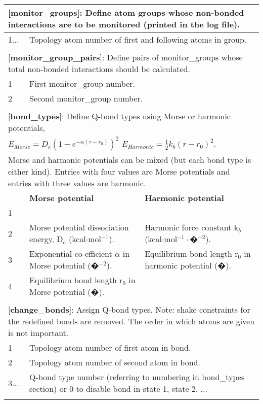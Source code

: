 \documentclass[a4paper,10pt]{article}
\begin{document}
\begin{longtable}{|p{53pt}|p{181pt}|p{160pt}|}
\multicolumn{3}{p{394pt}}{[\textbf{monitor\_groups}]: Define atom groups whose non-bonded interactions are to be monitored (printed in the log file).}\\
\hline 1... & \multicolumn{2}{p{341pt}|}{Topology atom number of first and following atoms in group.}\\
\hline
\multicolumn{3}{p{394pt}}{}\\

\multicolumn{3}{p{394pt}}{[\textbf{monitor\_group\_pairs}]: Define pairs of monitor\_groups whose total non-bonded interactions should be calculated.}\\
\hline 1 & \multicolumn{2}{p{341pt}|}{First monitor\_group number.}\\
\hline 2 & \multicolumn{2}{p{341pt}|}{Second monitor\_group number.}\\
\hline
\multicolumn{3}{p{394pt}}{}\\

\multicolumn{3}{p{394pt}}{[\textbf{bond\_types}]: Define Q-bond types using Morse or harmonic potentials,}\\
\multicolumn{3}{p{394pt}}{$E_{Morse}=D_e \left(1-e^{-\alpha\left(r-r_0\right)}\right)^2$   $E_{Harmonic}=\frac{1}{2}k_b\left(r-r_0\right)^2$.}\\
\multicolumn{3}{p{394pt}}{Morse and harmonic potentials can be mixed (but each bond type is either kind). Entries with four values are Morse potentials and entries with three values are harmonic.}\\
\hline & \textbf{Morse potential} & \textbf{Harmonic potential}\\
\hline 1 & \multicolumn{2}{p{341pt}|}{\centering{Q-bond type number (starting with 1).}}\\
\hline 2 & Morse potential dissociation energy, D$_e$ (kcal$\cdot$mol$^{-1}$). &  Harmonic force constant k$_b$ (kcal$\cdot$mol$^{-1}\cdot$�$^{-2}$).\\
\hline 3 & Exponential co-efficient $\alpha$ in Morse potential (�$^{-2}$). & Equilibrium bond length r$_0$ in harmonic potential (�).\\
\hline 4 & Equilibrium bond length r$_0$ in Morse potential (�).&\\
\hline
\multicolumn{3}{p{394pt}}{}\\

\multicolumn{3}{p{394pt}}{[\textbf{change\_bonds}]: Assign Q-bond types. Note: shake constraints for the redefined bonds are removed. The order in which atoms are given is not important.}\\
\hline 1 & \multicolumn{2}{p{341pt}|}{Topology atom number of first atom in bond.}\\
\hline 2 & \multicolumn{2}{p{341pt}|}{Topology atom number of second atom in bond.}\\
\hline 3... & \multicolumn{2}{p{341pt}|}{Q-bond type number (referring to numbering in bond\_types section) or 0 to disable bond in state 1, state 2, ...}\\
\hline
\multicolumn{3}{p{394pt}}{}\\


\end{longtable}
\end{document}
